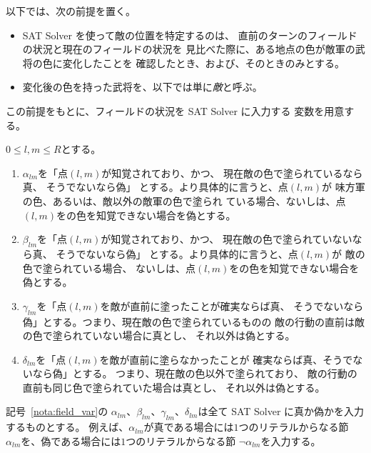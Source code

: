 以下では、次の前提を置く。
\begin{itemize}
 \item SAT Solver を使って敵の位置を特定するのは、
       直前のターンのフィールドの状況と現在のフィールドの状況を
       見比べた際に、ある地点の色が敵軍の武将の色に変化したことを
       確認したとき、および、そのときのみとする。
 \item 変化後の色を持った武将を、以下では単に\emph{敵}と呼ぶ。
\end{itemize}

この前提をもとに、フィールドの状況を SAT Solver に入力する
変数を用意する。
\begin{nota}[フィールドからの制約変数] \label{nota:field_var}
 $0 \leq l, m \leq R$とする。
 \begin{enumerate}[1.]
  \item $\alpha_{lm}$を「点$(l, m)$が知覚されており、かつ、
        現在敵の色で塗られているなら真、
        そうでないなら偽」
        とする。より具体的に言うと、点$(l, m)$が
        味方軍の色、あるいは、敵以外の敵軍の色で塗られ
        ている場合、ないしは、点$(l, m)$をの色を知覚できない場合を偽とする。
  \item $\beta_{lm}$を「点$(l, m)$が知覚されており、かつ、
        現在敵の色で塗られていないなら真、
        そうでないなら偽」
        とする。より具体的に言うと、点$(l, m)$が
        敵の色で塗られている場合、
        ないしは、点$(l, m)$をの色を知覚できない場合を偽とする。
  \item $\gamma_{lm}$を「点$(l, m)$を敵が直前に塗ったことが確実ならば真、
        そうでないなら偽」とする。つまり、現在敵の色で塗られているものの
        敵の行動の直前は敵の色で塗られていない場合に真とし、
        それ以外は偽とする。
  \item $\delta_{lm}$を「点$(l, m)$を敵が直前に塗らなかったことが
        確実ならば真、そうでないなら偽」とする。
        つまり、現在敵の色以外で塗られており、
        敵の行動の直前も同じ色で塗られていた場合は真とし、
        それ以外は偽とする。
 \end{enumerate}
\end{nota}

\begin{rem}
 記号~\ref{nota:field_var}の
 $\alpha_{lm}$、$\beta_{lm}$、$\gamma_{lm}$、$\delta_{lm}$は全て
 SAT Solver に真か偽かを入力するものとする。
 例えば、$\alpha_{lm}$が真である場合には$1$つのリテラルからなる節
 $\alpha_{lm}$を、偽である場合には$1$つのリテラルからなる節
 $\lnot \alpha_{lm}$を入力する。
\end{rem}

